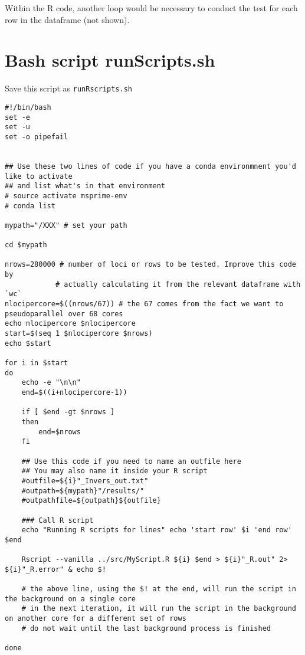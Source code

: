 \documentclass[
  letterpaper,
  DIV=11,
  numbers=noendperiod]{scrreprt}
\begin{document}
Within the R code, another loop would be necessary to conduct the test
for each row in the dataframe (not shown).

\hypertarget{bash-script-runscripts.sh}{%
\section*{\texorpdfstring{\textbf{Bash script
runScripts.sh}}{Bash script runScripts.sh}}\label{bash-script-runscripts.sh}}


Save this script as \texttt{runRscripts.sh}

\begin{verbatim}
#!/bin/bash
set -e
set -u
set -o pipefail


## Use these two lines of code if you have a conda environmnent you'd like to activate
## and list what's in that environment
# source activate msprime-env
# conda list

mypath="/XXX" # set your path

cd $mypath

nrows=280000 # number of loci or rows to be tested. Improve this code by
            # actually calculating it from the relevant dataframe with `wc`
nlocipercore=$((nrows/67)) # the 67 comes from the fact we want to pseudoparallel over 68 cores
echo nlocipercore $nlocipercore
start=$(seq 1 $nlocipercore $nrows)
echo $start

for i in $start
do
    echo -e "\n\n"
    end=$((i+nlocipercore-1))
    
    if [ $end -gt $nrows ]
    then
        end=$nrows
    fi
    
    ## Use this code if you need to name an outfile here
    ## You may also name it inside your R script
    #outfile=${i}"_Invers_out.txt"
    #outpath=${mypath}"/results/"
    #outpathfile=${outpath}${outfile}
    
    ### Call R script
    echo "Running R scripts for lines" echo 'start row' $i 'end row' $end
    
    Rscript --vanilla ../src/MyScript.R ${i} $end > ${i}"_R.out" 2> ${i}"_R.error" & echo $!
    
    # the above line, using the $! at the end, will run the script in the background on a single core
    # in the next iteration, it will run the script in the background on another core for a different set of rows
    # do not wait until the last background process is finished
    
done
\end{verbatim}
\end{document}
